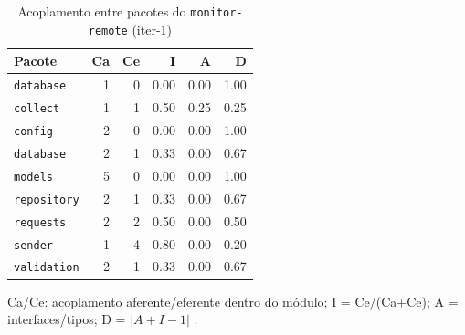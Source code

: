 \begin{table}[htbp]
  \centering\small
  \caption{Acoplamento entre pacotes do \texttt{monitor-remote} (iter-1)}
  \label{tab:iter-1-acoplamento-remote}
  \begin{tabular}{lrrrrr}
    \toprule
    Pacote & Ca & Ce & I & A & D \\
    \midrule
    \texttt{database} & 1 & 0 & 0.00 & 0.00 & 1.00 \\
    \texttt{collect} & 1 & 1 & 0.50 & 0.25 & 0.25 \\
    \texttt{config} & 2 & 0 & 0.00 & 0.00 & 1.00 \\
    \texttt{database} & 2 & 1 & 0.33 & 0.00 & 0.67 \\
    \texttt{models} & 5 & 0 & 0.00 & 0.00 & 1.00 \\
    \texttt{repository} & 2 & 1 & 0.33 & 0.00 & 0.67 \\
    \texttt{requests} & 2 & 2 & 0.50 & 0.00 & 0.50 \\
    \texttt{sender} & 1 & 4 & 0.80 & 0.00 & 0.20 \\
    \texttt{validation} & 2 & 1 & 0.33 & 0.00 & 0.67 \\
    \bottomrule
  \end{tabular}
  \par\smallskip\footnotesize Ca/Ce: acoplamento aferente/eferente dentro do módulo; I = Ce/(Ca+Ce); A = interfaces/tipos; D = $|A+I-1|$ \cite{martin2002}.
\end{table}

